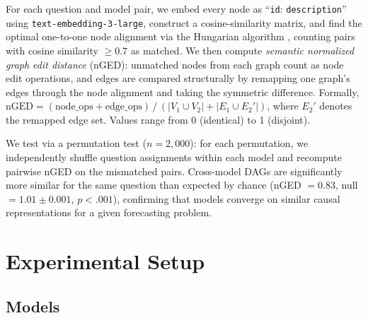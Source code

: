 \documentclass[11pt]{article}
\begin{document}
For each question and model pair, we embed every node as ``\texttt{id}: \texttt{description}'' using \texttt{text-embedding-3-large}, construct a cosine-similarity matrix, and find the optimal one-to-one node alignment via the Hungarian algorithm \citep{kuhn1955hungarian}, counting pairs with cosine similarity $\geq 0.7$ as matched. We then compute \emph{semantic normalized graph edit distance} (nGED): unmatched nodes from each graph count as node edit operations, and edges are compared structurally by remapping one graph's edges through the node alignment and taking the symmetric difference. Formally, $\text{nGED} = (\text{node\_ops} + \text{edge\_ops}) \,/\, (|V_1 \cup V_2| + |E_1 \cup E_2'|)$, where $E_2'$ denotes the remapped edge set. Values range from 0 (identical) to 1 (disjoint).

We test via a permutation test ($n = 2{,}000$): for each permutation, we independently shuffle question assignments within each model and recompute pairwise nGED on the mismatched pairs. Cross-model DAGs are significantly more similar for the same question than expected by chance (nGED $= 0.83$, null $= 1.01 \pm 0.001$, $p < .001$), confirming that models converge on similar causal representations for a given forecasting problem.

\section{Experimental Setup}
\label{sec:setup}

\subsection{Models}
\end{document}
